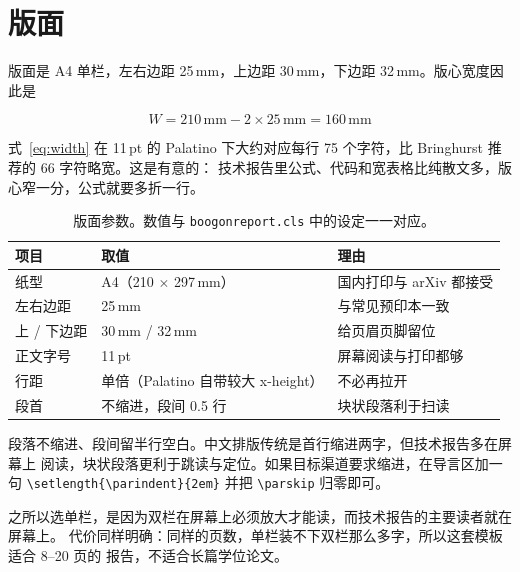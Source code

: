 \section{版面}
\label{sec:layout}

版面是 A4 单栏，左右边距 25\,mm，上边距 30\,mm，下边距 32\,mm。版心宽度因此是

\begin{equation}
  W = 210\,\text{mm} - 2 \times 25\,\text{mm} = 160\,\text{mm}
  \label{eq:width}
\end{equation}

式~\eqref{eq:width} 在 11\,pt 的 Palatino 下大约对应每行 75 个字符，比
Bringhurst 推荐的 66 字符略宽\citep{bringhurst2013elements}。这是有意的：
技术报告里公式、代码和宽表格比纯散文多，版心窄一分，公式就要多折一行。

\begin{table}[htbp]
  \centering
  \small
  \caption{版面参数。数值与 \texttt{boogonreport.cls} 中的设定一一对应。}
  \label{tab:layout}
  \begin{tabular}{@{}lll@{}}
    \toprule
    项目 & 取值 & 理由 \\
    \midrule
    纸型          & A4（210 $\times$ 297\,mm） & 国内打印与 arXiv 都接受 \\
    左右边距      & 25\,mm                     & 与常见预印本一致 \\
    上 / 下边距   & 30\,mm / 32\,mm            & 给页眉页脚留位 \\
    正文字号      & 11\,pt                     & 屏幕阅读与打印都够 \\
    行距          & 单倍（Palatino 自带较大 x-height） & 不必再拉开 \\
    段首          & 不缩进，段间 0.5 行        & 块状段落利于扫读 \\
    \bottomrule
  \end{tabular}
\end{table}

段落不缩进、段间留半行空白。中文排版传统是首行缩进两字，但技术报告多在屏幕上
阅读，块状段落更利于跳读与定位。如果目标渠道要求缩进，在导言区加一句
\verb|\setlength{\parindent}{2em}| 并把 \verb|\parskip| 归零即可。

之所以选单栏，是因为双栏在屏幕上必须放大才能读，而技术报告的主要读者就在屏幕上。
代价同样明确：同样的页数，单栏装不下双栏那么多字，所以这套模板适合 8--20 页的
报告，不适合长篇学位论文。
